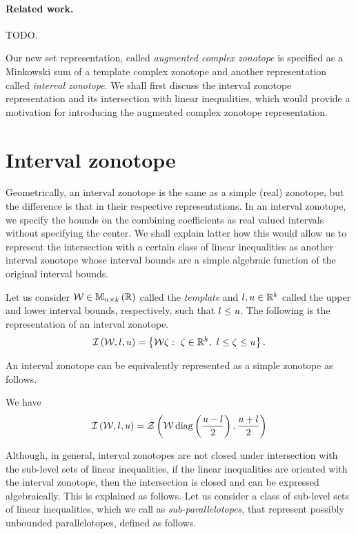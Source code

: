 \paragraph{Related work.} {\color{red} TODO.}


Our new set representation, called {\it augmented complex zonotope} is
specified as a Minkowski sum of a template complex zonotope and
another representation called {\it interval zonotope}.  We shall first
discuss the interval zonotope representation and its intersection with
linear inequalities, which would provide a motivation for introducing the
augmented complex zonotope representation.

\section{Interval zonotope}
Geometrically, an interval zonotope is the same as a simple (real)
zonotope, but the difference is that in their respective
representations.  In an interval zonotope, we specify the bounds on
the combining coefficients as real valued intervals without specifying
the center.  We shall explain latter how this would allow us to
represent the intersection with a certain class of linear inequalities
as another interval zonotope whose interval bounds are a simple
algebraic function of the original interval bounds.
%
\begin{definition}
Let us consider $\mathcal{W}\in\mathbb{M}_{n\times k}\left(\mathbb{R}\right)$ called the {\it
  template} and $l,u\in\mathbb{R}^k$ called the upper and lower
interval bounds, respectively, such that $l\leq u$.  The following
is the representation of an interval zonotope.
%
\[
\mathit{\operatorname{\mathcal{I}}}\left(\mathcal{W},l,u\right)=\left\{\mathcal{W}\zeta:~\zeta\in\mathbb{R}^k,~l\leq\zeta\leq u\right\}.
\]
%
\end{definition}
%
An interval zonotope can be equivalently represented as a simple
zonotope as follows.
%
\begin{proposition}
We have
%
\[
\mathit{\operatorname{\mathcal{I}}}\left(\mathcal{W},l,u\right)=\mathit{\mathcal{Z}}\left(\mathcal{W}\operatorname{diag}\left(\frac{u-l}{2}\right),\frac{u+l}{2}\right)
\]
%
\end{proposition}
%
Although, in general, interval zonotopes are not closed under
intersection with the sub-level sets of linear inequalities, if the
linear inequalities are oriented with the interval zonotope, then the
intersection is closed and can be expressed algebraically.  This is
explained as follows.  Let us consider a class of sub-level sets of
linear inequalities, which we call as {\it sub-parallelotopes}, that
represent possibly unbounded parallelotopes, defined as follows.
